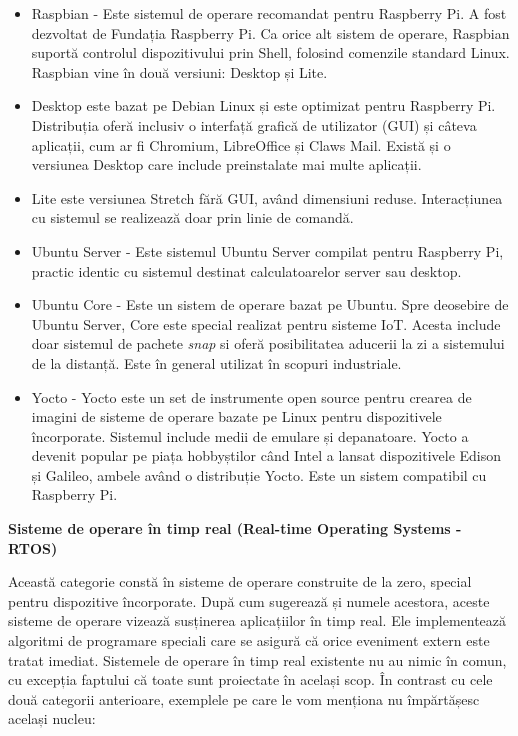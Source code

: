 \begin{itemize}
  \item Raspbian - Este sistemul de operare recomandat pentru Raspberry
    Pi. A fost dezvoltat de Fundația Raspberry Pi. Ca orice alt
    sistem de operare, Raspbian suportă controlul dispozitivului
    prin Shell, folosind comenzile standard Linux. Raspbian vine în
    două versiuni: Desktop și Lite.
  \item Desktop este bazat pe Debian Linux și este optimizat pentru
    Raspberry Pi. Distribuția oferă inclusiv o interfață grafică de
    utilizator (GUI) și câteva aplicații, cum ar fi Chromium,
    LibreOffice și Claws Mail. Există și o versiunea Desktop care include
    preinstalate mai multe aplicații.
  \item Lite este versiunea Stretch fără GUI, având dimensiuni
    reduse. Interacțiunea cu sistemul se realizează doar prin linie
    de comandă.
  \item Ubuntu Server - Este sistemul Ubuntu Server compilat pentru Raspberry Pi, 
    practic identic cu sistemul destinat calculatoarelor server sau desktop.
  \item Ubuntu Core - Este un sistem de operare bazat pe Ubuntu. Spre deosebire
    de Ubuntu Server, Core este special realizat pentru sisteme IoT.
    Acesta include doar sistemul de pachete \textit{snap} si oferă posibilitatea
    aducerii la zi a sistemului de la distanță. Este în general utilizat 
    în scopuri industriale.
  \item Yocto - Yocto este un set de instrumente open source pentru
    crearea de imagini de sisteme de operare bazate pe Linux pentru
    dispozitivele încorporate. Sistemul include medii de emulare și
    depanatoare. Yocto a devenit popular pe piața hobbyștilor când
    Intel a lansat dispozitivele Edison și Galileo, ambele având o
    distribuție Yocto. Este un sistem compatibil cu Raspberry Pi.
\end{itemize}

\textbf{Sisteme de operare în timp real (Real-time Operating Systems - RTOS)}

Această categorie constă în sisteme de operare construite de la zero, special
pentru dispozitive încorporate. După cum sugerează și numele acestora, aceste
sisteme de operare vizează susținerea aplicațiilor în timp real. Ele
implementează algoritmi de programare speciali care se asigură că orice
eveniment extern este tratat imediat. Sistemele de operare în timp real existente
nu au nimic în comun, cu excepția faptului că toate sunt proiectate în același
scop. În contrast cu cele două categorii anterioare, exemplele pe care le vom
menționa nu împărtășesc același nucleu:

